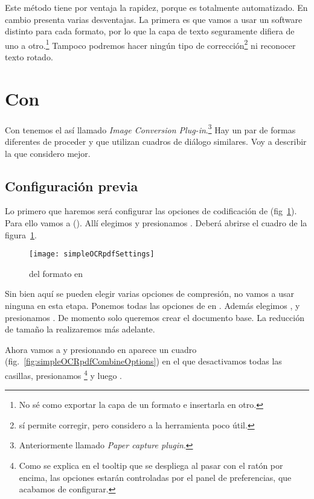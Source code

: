 \documentclass[%
	a5paper,
	10pt,
	twoside,
	openright,
	final,
]{memoir}
\begin{document}
{	Este método tiene por ventaja la rapidez, porque es totalmente automatizado. En cambio presenta varias desventajas. La primera es que vamos a usar un software distinto para cada formato, por lo que la capa de texto seguramente difiera de uno a otro.\footnote{No sé como exportar la capa \ocr de un formato e insertarla en otro.} Tampoco podremos hacer ningún tipo de corrección\footnote{\acrobat sí permite corregir, pero considero a la herramienta poco útil.} ni reconocer texto rotado.

	\section{Con \acrobat} Con \acrobat tenemos el así llamado \emph{Image Conversion Plug-in}.\footnote{Anteriormente llamado \emph{Paper capture plugin}.} Hay un par de formas diferentes de proceder y que utilizan cuadros de diálogo similares. Voy a describir la que considero mejor.

	\subsection{Configuración previa} Lo primero que haremos será configurar las opciones de codificación de \acrobat (fig~\ref{fig:simpleOCRpdfSettings}). Para ello vamos a  (). Allí elegimos  y presionamos . Deberá abrirse el cuadro de la figura~\ref{fig:simpleOCRpdfSettings}.

	\begin{figure}
		\centering
		\texttt{[image: simpleOCRpdfSettings]}
		\caption[\texttt{Edit Settings} del formato \tiff en \acrobat]{ del formato \tiff en \acrobat\label{fig:simpleOCRpdfSettings}}
	\end{figure}

	Sin bien aquí se pueden elegir varias opciones de compresión, no vamos a usar ninguna en esta etapa. Ponemos todas las opciones de  en . Además elegimos ,  y presionamos . De momento solo queremos crear el documento base. La reducción de tamaño la realizaremos más adelante.

	Ahora vamos a  y presionando en  aparece un cuadro (fig.~\ref{fig:simpleOCRpdfCombineOptions}) en el que desactivamos todas las casillas, presionamos \footnote{Como se explica en el tooltip que se despliega al pasar con el ratón por encima, las opciones estarán controladas por el panel de preferencias, que acabamos de configurar.} y luego .

}
\end{document}
